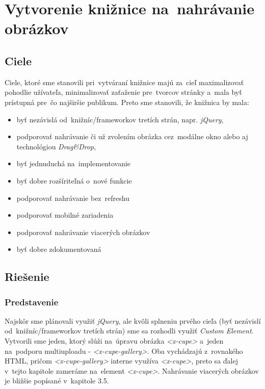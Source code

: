 \chapter{Vytvorenie knižnice na~nahrávanie obrázkov}
\section{Ciele}

Ciele, ktoré sme stanovili pri~vytváraní knižnice majú za~cieľ maximalizovať pohodlie užívateľa, minimalizovať zaťaženie pre~tvorcov stránky a~mala byť prístupná pre~čo najširšie publikum. Preto sme stanovili, že knižnica by mala:

\begin{itemize}
	\item byť nezávislá od~knižníc/frameworkov tretích strán, napr. \emph{jQuery},
	\item podporovať nahrávanie či už zvolením obrázka cez~modálne okno alebo aj technológiou \emph{Drag&Drop}, 
	\item byť jednuduchá na~implementovanie
	\item byť dobre rozšíriteľná o~nové funkcie
	\item podporovať nahrávanie bez~refreshu
	\item podporovať mobilné zariadenia
	\item podporovať nahrávanie viacerých obrázkov
	\item byť dobre zdokumentovaná
\end{itemize}


\section{Riešenie}
\subsection{Predstavenie}
Najskôr sme plánovali využiť \emph{jQuery}, ale kvôli splneniu prvého cieľa (byť nezávislí od~knižníc/frameworkov tretích strán) sme sa rozhodli využiť \emph{Custom Element}. Vytvorili sme jeden, ktorý slúži na~úpravu obrázka \emph{<x-cupe>} a~jeden na~podporu multiuploadu - \emph{<x-cupe-gallery>}. Oba vychádzajú z~rovnakého HTML, pričom \emph{<x-cupe-gallery>} interne využíva \emph{<x-cupe>}, preto sa ďalej v~tejto kapitole zameráme na~element \emph{<x-cupe>}. Nahrávanie viacerých obrázkov je bližšie popísané v~kapitole 3.5.


